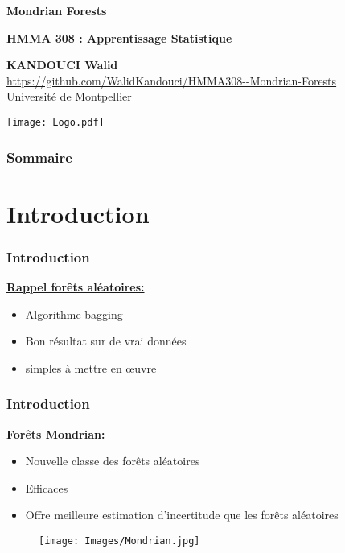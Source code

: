 \documentclass[unknownkeysallowed]{beamer}
\begin{document}
\begin{frame}[noframenumbering]
\thispagestyle{empty}
\bigskip
\bigskip
\begin{center}{
\LARGE\color{marron}
\textbf{Mondrian Forests}
\textbf{ }\\
\vspace{0.5cm}
}

\color{marron}
\textbf{HMMA 308 : Apprentissage Statistique}
\end{center}

\vspace{0.5cm}

\begin{center}
\textbf{KANDOUCI Walid} \\
\vspace{0.1cm}
\url{https://github.com/WalidKandouci/HMMA308--Mondrian-Forests}\\
\vspace{0.5cm}
Université de Montpellier \\
\end{center}

\centering
\texttt{[image: Logo.pdf]}
\end{frame}








\begin{frame}
\frametitle{Sommaire}
\tableofcontents
\end{frame}


\section{Introduction}
\begin{frame}
\frametitle{Introduction}
\underline{\textbf{Rappel forêts aléatoires:}}
\begin{itemize}
    \item Algorithme bagging
    \item Bon résultat sur de vrai données
    \item simples à mettre en œuvre
\end{itemize}
\end{frame}

\begin{frame}
\frametitle{Introduction}
\underline{\textbf{Forêts Mondrian:}}
\begin{itemize}
    \item Nouvelle classe des forêts aléatoires
    \item Efficaces
    \item Offre meilleure estimation d'incertitude que les forêts aléatoires
\end{itemize}
\begin{figure}[H]
    \centering
    \texttt{[image: Images/Mondrian.jpg]}
\end{figure}
\end{frame}
\end{document}
